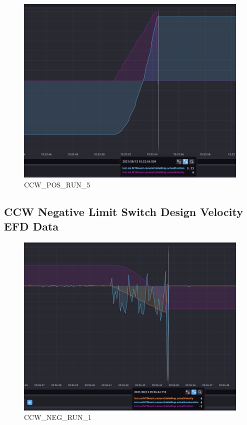 \documentclass[SE,lsstdraft,authoryear,toc]{lsstdoc}
\begin{document}
\begin{figure}
  \includegraphics[width=\linewidth]{media/ccw_pos_5.png}
  \caption{CCW\_POS\_RUN\_5}
  \label{fig:CCW_POS_RUN_5}
\end{figure}
\subsection{CCW Negative Limit Switch Design Velocity EFD Data}
\begin{figure}
  \includegraphics[width=\linewidth]{media/ccw_neg_1.png}
  \caption{CCW\_NEG\_RUN\_1}
  \label{fig:CCW_NEG_RUN_1}
\end{figure}
\end{document}
